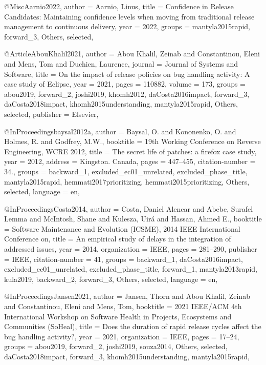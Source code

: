 @Misc{Aarnio2022,
  author = {Aarnio, Linus},
  title  = {Confidence in Release Candidates: Maintaining confidence levels when moving from traditional release management to continuous delivery},
  year   = {2022},
  groups = {mantyla2015rapid, forward_3, Others, selected},
}

@Article{AbouKhalil2021,
  author    = {Abou Khalil, Zeinab and Constantinou, Eleni and Mens, Tom and Duchien, Laurence},
  journal   = {Journal of Systems and Software},
  title     = {On the impact of release policies on bug handling activity: A case study of Eclipse},
  year      = {2021},
  pages     = {110882},
  volume    = {173},
  groups    = {abou2019, forward_2, joshi2019, khomh2012, daCosta2016impact, forward_3, daCosta2018impact, khomh2015understanding, mantyla2015rapid, Others, selected},
  publisher = {Elsevier},
}

@InProceedings{baysal2012a,
  author          = {Baysal, O. and Kononenko, O. and Holmes, R. and Godfrey, M.W.},
  booktitle       = {19th Working Conference on Reverse Engineering, WCRE 2012},
  title           = {The secret life of patches: a firefox case study},
  year            = {2012},
  address         = {Kingston. Canada},
  pages           = {447–455},
  citation-number = {34.},
  groups          = {backward_1, excluded_ec01_unrelated, excluded_phase_title, mantyla2015rapid, hemmati2017prioritizing, hemmati2015prioritizing, Others, selected},
  language        = {en},
}

@InProceedings{Costa2014,
  author          = {Costa, Daniel Alencar and Abebe, Surafel Lemma and McIntosh, Shane and Kulesza, Uirá and Hassan, Ahmed E.},
  booktitle       = {Software Maintenance and Evolution (ICSME), 2014 IEEE International Conference on},
  title           = {An empirical study of delays in the integration of addressed issues},
  year            = {2014},
  organization    = {IEEE},
  pages           = {281–290},
  publisher       = {IEEE},
  citation-number = {41},
  groups          = {backward_1, daCosta2016impact, excluded_ec01_unrelated, excluded_phase_title, forward_1, mantyla2013rapid, kula2019, backward_2, forward_3, Others, selected},
  language        = {en},
}

@InProceedings{Jansen2021,
  author       = {Jansen, Thorn and Abou Khalil, Zeinab and Constantinou, Eleni and Mens, Tom},
  booktitle    = {2021 IEEE/ACM 4th International Workshop on Software Health in Projects, Ecosystems and Communities (SoHeal)},
  title        = {Does the duration of rapid release cycles affect the bug handling activity?},
  year         = {2021},
  organization = {IEEE},
  pages        = {17--24},
  groups       = {abou2019, forward_2, joshi2019, souza2014, Others, selected, daCosta2018impact, forward_3, khomh2015understanding, mantyla2015rapid},
}

